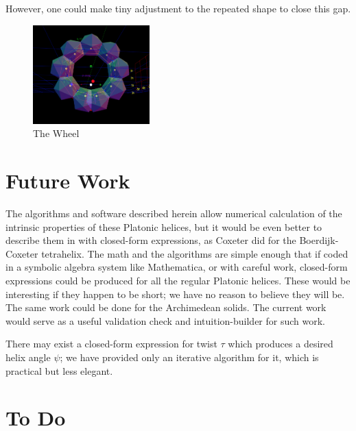 \documentclass[11pt]{article}
\begin{document}
{\begin{itemize}
  However, one could make tiny adjustment to the repeated shape to close this gap.
\begin{figure}
     \centering
     \includegraphics[width=0.40\textwidth]{figures/TheWheel.png}
     \caption{The Wheel}
  \label{fig:thewheel}
\end{figure}
\end{itemize}

\section{Future Work}

The algorithms and software described herein allow numerical calculation of the intrinsic properties of these
Platonic helices, but it would be even better to describe them in with closed-form expressions,
as Coxeter did for the Boerdijk-Coxeter tetrahelix.
The math and the algorithms are simple enough that if coded in a symbolic algebra system like Mathematica,
or with careful work, closed-form
expressions could be produced for all the regular Platonic helices.
These would be interesting if they happen to be short; we have no reason to
believe they will be. The same work could be done for the Archimedean solids. The current work would
serve as a useful validation check and intuition-builder for such work.

There may exist a closed-form expression for twist $\tau$ which produces a desired helix angle $\psi$; we have provided only
an iterative algorithm for it, which is practical but less elegant.

\section{ To Do}

}
\end{document}
